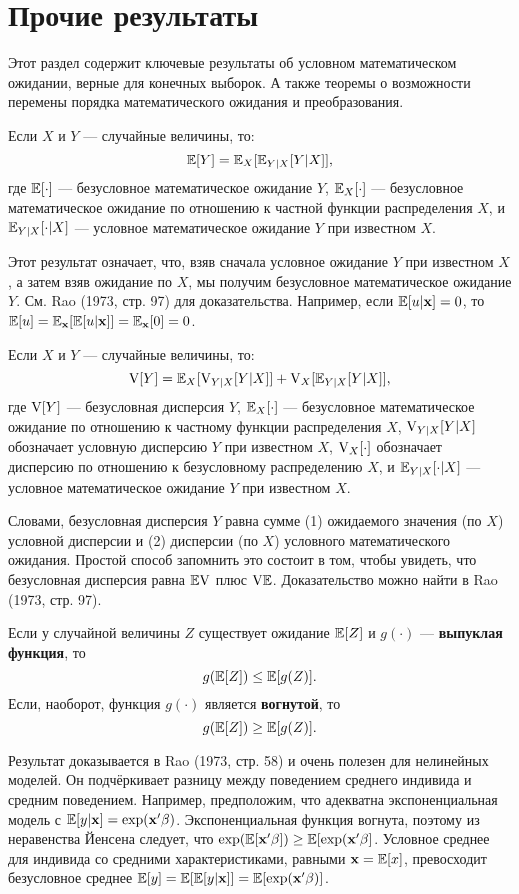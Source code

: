 \section{Прочие результаты}

Этот раздел содержит ключевые результаты об условном математическом ожидании, верные для конечных выборок. А также теоремы о возможности перемены порядка математического ожидания и преобразования.

\begin{theorem}
Если  $X$ и $Y$ --- случайные величины, то:
\[
\mathbb{E}[Y]=\mathbb{E}_X[\mathbb{E}_{Y|X}[Y|X]],
\]
где $\mathbb{E}[\cdot]$ --- безусловное математическое ожидание $Y$, $\mathbb{E}_X[\cdot]$ --- безусловное математическое ожидание по отношению к частной функции распределения $X$, и $\mathbb{E}_{Y|X}[\cdot|X]$ --- условное математическое ожидание $Y$ при известном $X$.	
 \end{theorem} 

Этот результат означает, что, взяв сначала условное ожидание $Y$ при известном $X$, а затем взяв ожидание по $X$, мы получим безусловное математическое ожидание $Y$. См. Rao (1973, стр. 97) для доказательства. Например, если $\mathbb{E}[u|\mathbf{x}]=0$, то $\mathbb{E}[u]=\mathbb{E}_{\mathbf{x}}[\mathbb{E}[u|\mathbf{x}]]=\mathbb{E}_{\mathbf{x}}[0]=0$.

\begin{theorem}
Если  $X$ и $Y$ --- случайные величины, то:
\[
\mathrm{V}[Y]=\mathbb{E}_X[\mathrm{V}_{Y|X}[Y|X]]+\mathrm{V}_X[\mathbb{E}_{Y|X}[Y|X]],
\]
где $\mathrm{V}[Y]$ --- безусловная дисперсия $Y$, $\mathbb{E}_X[\cdot]$ --- безусловное математическое ожидание по отношению к частному функции распределения $X$, $\mathrm{V}_{Y|X}[Y|X]$ обозначает условную дисперсию $Y$ при известном $X$, $\mathrm{V}_X[\cdot]$ обозначает дисперсию по отношению к безусловному распределению $X$, и $\mathbb{E}_{Y|X}[\cdot|X]$ --- условное математическое ожидание $Y$ при известном $X$.	
\end{theorem}

Словами, безусловная дисперсия $Y$ равна сумме (1) ожидаемого значения (по $X$) условной дисперсии и (2) дисперсии (по $X$) условного математического ожидания. Простой способ запомнить это состоит в том, чтобы увидеть, что безусловная дисперсия равна $\mathbb{E}\mathrm{V}$ плюс $\mathrm{V}\mathbb{E}$. Доказательство можно найти в Rao (1973, стр. 97).

\begin{theorem}
Если у случайной величины $Z$ существует ожидание $\mathbb{E}[Z]$ и $g(\cdot)$ --- \textbf{выпуклая функция}, то
\[
g(\mathbb{E}[Z]) \leq \mathbb{E}[g(Z)].
\]
Если, наоборот, функция $g(\cdot)$ является \textbf{вогнутой}, то
\[
g(\mathbb{E}[Z]) \geq \mathbb{E}[g(Z)].
\]
\end{theorem}
Результат доказывается в Rao (1973, стр. 58) и очень полезен для нелинейных моделей. Он подчёркивает разницу между поведением среднего индивида и средним поведением. Например, предположим, что адекватна экспоненциальная модель с $\mathbb{E}[y|\mathbf{x}]=\exp(\mathbf{x}'\mathbf{\beta})$. Экспоненциальная функция вогнута, поэтому из неравенства Йенсена следует, что $\exp(\mathbb{E}[\mathbf{x}'\mathbf{\beta}])\geq \mathbb{E}[\exp(\mathbf{x}'\mathbf{\beta}]$. Условное среднее для индивида со средними характеристиками, равными $\mathbf{x}=\mathbb{E}[x]$, превосходит безусловное среднее $\mathbb{E}[y]=\mathbb{E}[\mathbb{E}[y|\mathbf{x}]]=\mathbb{E}[\exp(\mathbf{x}'\mathbf{\beta})]$.

